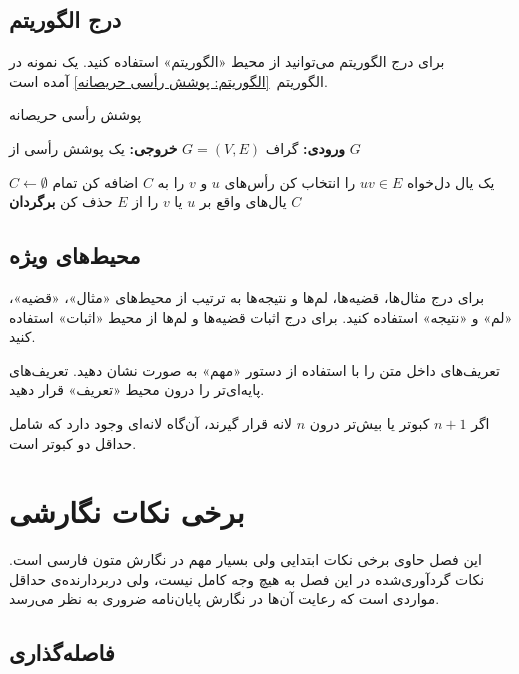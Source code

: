 \subsection{درج الگوریتم}

برای درج الگوریتم می‌توانید از محیط «الگوریتم» استفاده کنید.
یک نمونه در الگوریتم~\ref{الگوریتم: پوشش رأسی حریصانه} آمده است.

\begin{algorithm}
    \caption{پوشش رأسی حریصانه}
    \begin{algorithmic}[1]
        \State \textbf{ورودی:} گراف $G=(V, E)$
        \State \textbf{خروجی:} یک پوشش رأسی از $G$

        \State $C \gets \emptyset$  %
            \State یک یال دل‌‌خواه $uv \in E$ را انتخاب کن
            \State رأس‌های $u$ و $v$ را به $C$ اضافه کن
            \State تمام یال‌های واقع بر $u$ یا $v$ را از $E$ حذف کن
        \EndWhile
        \State \textbf{برگردان} $C$
    \end{algorithmic}
\end{algorithm}


\subsection{محیط‌های ویژه}

برای درج مثال‌ها، قضیه‌ها، لم‌ها و نتیجه‌ها به ترتیب از محیط‌های
«مثال»، «قضیه»، «لم» و «نتیجه» استفاده کنید.
برای درج اثبات قضیه‌ها و لم‌ها  از محیط «اثبات» استفاده کنید.

تعریف‌های داخل متن را با استفاده از دستور «مهم» به صورت  نشان دهید.
تعریف‌های پایه‌ای‌تر را درون محیط «تعریف» قرار دهید.

\begin{تعریف}
اگر $n+1$ کبوتر یا بیش‌تر درون  $n$ لانه قرار گیرند، آن‌گاه لانه‌ای
وجود دارد که شامل حداقل دو کبوتر است.
\end{تعریف}




\section{برخی نکات نگارشی}

این فصل حاوی برخی نکات ابتدایی ولی بسیار مهم در نگارش متون فارسی است.
نکات گردآوری‌شده در این فصل به‌ هیچ‌ وجه کامل نیست،
ولی دربردارنده‌ی حداقل مواردی است که رعایت آن‌ها در نگارش پایان‌نامه ضروری به نظر می‌رسد.

\subsection{فاصله‌گذاری}

